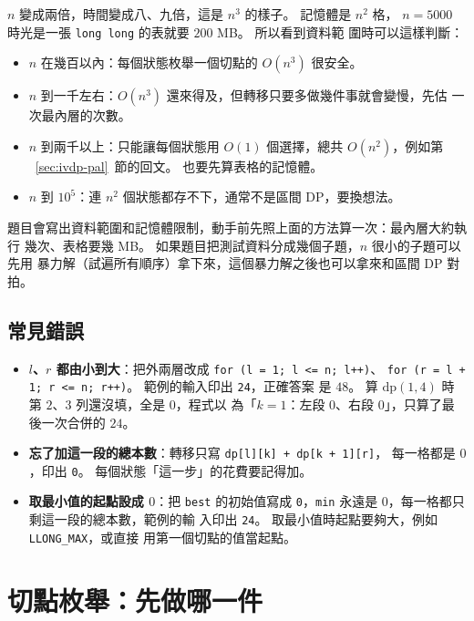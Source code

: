 $n$ 變成兩倍，時間變成八、九倍，這是 $n^3$ 的樣子。 記憶體是 $n^2$ 格，
$n = 5000$ 時光是一張 \texttt{long long} 的表就要 $200$ MB。 所以看到資料範
圍時可以這樣判斷：

\begin{itemize}
\item $n$ 在幾百以內：每個狀態枚舉一個切點的 $O(n^3)$ 很安全。
\item $n$ 到一千左右：$O(n^3)$ 還來得及，但轉移只要多做幾件事就會變慢，先估
一次最內層的次數。
\item $n$ 到兩千以上：只能讓每個狀態用 $O(1)$ 個選擇，總共 $O(n^2)$，例如第
~\ref{sec:ivdp-pal}~節的回文。 也要先算表格的記憶體。
\item $n$ 到 $10^5$：連 $n^2$ 個狀態都存不下，通常不是區間 DP，要換想法。
\end{itemize}

\begin{apcsnote}
題目會寫出資料範圍和記憶體限制，動手前先照上面的方法算一次：最內層大約執行
幾次、表格要幾 MB。 如果題目把測試資料分成幾個子題，$n$ 很小的子題可以先用
暴力解（試遍所有順序）拿下來，這個暴力解之後也可以拿來和區間 DP 對拍。
\end{apcsnote}

\subsection{常見錯誤}

\begin{itemize}
\item \textbf{$l$、$r$ 都由小到大}：把外兩層改成 \texttt{for (l = 1; l <= n; l++)}、
\texttt{for (r = l + 1; r <= n; r++)}。 範例的輸入印出 \texttt{24}，正確答案
是 $48$。 算 $\mathrm{dp}(1, 4)$ 時第 $2$、$3$ 列還沒填，全是 $0$，程式以
為「$k = 1$：左段 $0$、右段 $0$」，只算了最後一次合併的 $24$。
\item \textbf{忘了加這一段的總本數}：轉移只寫 \texttt{dp[l][k] + dp[k + 1][r]}，
每一格都是 $0$，印出 \texttt{0}。 每個狀態「這一步」的花費要記得加。
\item \textbf{取最小值的起點設成 $0$}：把 \texttt{best} 的初始值寫成
\texttt{0}，\texttt{min} 永遠是 $0$，每一格都只剩這一段的總本數，範例的輸
入印出 \texttt{24}。 取最小值時起點要夠大，例如 \texttt{LLONG\_MAX}，或直接
用第一個切點的值當起點。
\end{itemize}

\section{切點枚舉：先做哪一件}
\label{sec:ivdp-split}

